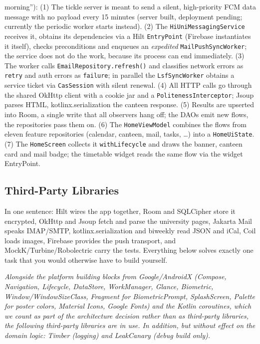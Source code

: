 \documentclass{msereport}
\begin{document}
\begin{itemize}
{        morning''):} (1) The tickle server is meant to send a silent,
        high-priority FCM data message with no payload every 15 minutes (server
        built, deployment pending; currently the periodic worker starts
        instead). (2) The \texttt{HiUniMessagingService} receives it, obtains
        its dependencies via a Hilt \texttt{EntryPoint} (Firebase instantiates
        it itself), checks preconditions and enqueues an \emph{expedited}
        \texttt{MailPushSyncWorker}; the service does not do the work, because
        its process can end immediately. (3) The worker calls
        \texttt{EmailRepository.refresh()} and classifies network errors as
        \texttt{retry} and auth errors as \texttt{failure}; in parallel the
        \texttt{LsfSyncWorker} obtains a service ticket via \texttt{CasSession}
        with silent renewal. (4) All HTTP calls go through the shared OkHttp
        client with a cookie jar and a \texttt{PolitenessInterceptor}; Jsoup
        parses HTML, kotlinx.serialization the canteen response. (5) Results are
        upserted into Room, a single write that all observers hang off; the DAOs
        emit new flows, the repositories pass them on. (6) The
        \texttt{HomeViewModel} combines the flows from eleven feature
        repositories (calendar, canteen, mail, tasks, \dots) into a
        \texttt{HomeUiState}. (7) The \texttt{HomeScreen} collects it
        \texttt{withLifecycle} and draws the banner, canteen card and mail
        badge; the timetable widget reads the same flow via the widget
        EntryPoint.
\end{itemize}

\subsection{Third-Party Libraries}

In one sentence: Hilt wires the app together, Room and SQLCipher store it
encrypted, OkHttp and Jsoup fetch and parse the university pages, Jakarta Mail
speaks IMAP/SMTP, kotlinx.serialization and biweekly read JSON and iCal, Coil
loads images, Firebase provides the push transport, and MockK/Turbine/Robolectric
carry the tests. Everything below solves exactly one task that you would
otherwise have to build yourself.
\par\vspace{6pt}

{\itshape Alongside the platform building blocks from Google/AndroidX (Compose,
Navigation, Lifecycle, DataStore, WorkManager, Glance, Biometric, Window/WindowSizeClass,
Fragment for BiometricPrompt, SplashScreen, Palette for poster colors, Material Icons,
Google Fonts) and the Kotlin coroutines, which we count as part of the architecture
decision rather than as third-party libraries, the following third-party libraries are
in use. In addition, but without effect on the domain logic: Timber (logging) and LeakCanary
(debug build only).\par}
\vspace{6pt}
\end{document}
